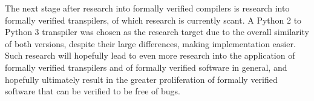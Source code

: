 The next stage after research into formally verified compilers is research into formally verified transpilers, of which research is currently scant. A Python 2 to Python 3 transpiler was chosen as the research target due to the overall similarity of both versions, despite their large differences, making implementation easier. Such research will hopefully lead to even more research into the application of formally verified transpilers and of formally verified software in general, and hopefully ultimately result in the greater proliferation of formally verified software that can be verified to be free of bugs.